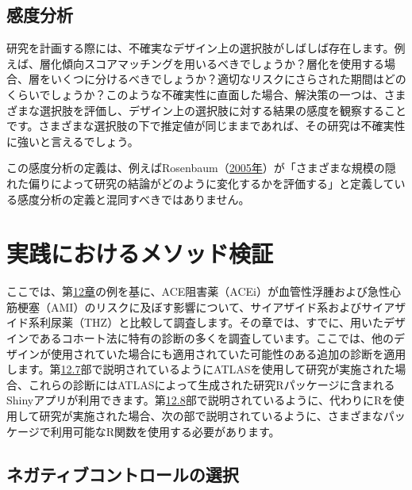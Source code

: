 \documentclass[
  11pt]{book}
\theoremstyle{definition}
\theoremstyle{definition}
\theoremstyle{definition}
\theoremstyle{definition}
\theoremstyle{remark}
\begin{document}
\subsection{感度分析}\label{ux611fux5ea6ux5206ux6790}


研究を計画する際には、不確実なデザイン上の選択肢がしばしば存在します。例えば、層化傾向スコアマッチングを用いるべきでしょうか？層化を使用する場合、層をいくつに分けるべきでしょうか？適切なリスクにさらされた期間はどのくらいでしょうか？このような不確実性に直面した場合、解決策の一つは、さまざまな選択肢を評価し、デザイン上の選択肢に対する結果の感度を観察することです。さまざまな選択肢の下で推定値が同じままであれば、その研究は不確実性に強いと言えるでしょう。

この感度分析の定義は、例えばRosenbaum（\href{https://ohdsi.github.io/TheBookOfOhdsi/MethodValidity.html\#ref-rosenbaum_2005}{2005年}）が「さまざまな規模の隠れた偏りによって研究の結論がどのように変化するかを評価する」と定義している感度分析の定義と混同すべきではありません。

\section{実践におけるメソッド検証}\label{ux5b9fux8df5ux306bux304aux3051ux308bux30e1ux30bdux30c3ux30c9ux691cux8a3c}

ここでは、第\href{https://ohdsi.github.io/TheBookOfOhdsi/PopulationLevelEstimation.html\#PopulationLevelEstimation}{12章}の例を基に、ACE阻害薬（ACEi）が血管性浮腫および急性心筋梗塞（AMI）のリスクに及ぼす影響について、サイアザイド系およびサイアザイド系利尿薬（THZ）と比較して調査します。その章では、すでに、用いたデザインであるコホート法に特有の診断の多くを調査しています。ここでは、他のデザインが使用されていた場合にも適用されていた可能性のある追加の診断を適用します。第\href{https://ohdsi.github.io/TheBookOfOhdsi/PopulationLevelEstimation.html\#PleAtlas}{12.7}部で説明されているようにATLASを使用して研究が実施された場合、これらの診断にはATLASによって生成された研究Rパッケージに含まれるShinyアプリが利用できます。第\href{https://ohdsi.github.io/TheBookOfOhdsi/PopulationLevelEstimation.html\#pleR}{12.8}部で説明されているように、代わりにRを使用して研究が実施された場合、次の部で説明されているように、さまざまなパッケージで利用可能なR関数を使用する必要があります。

\subsection{ネガティブコントロールの選択}\label{ux30cdux30acux30c6ux30a3ux30d6ux30b3ux30f3ux30c8ux30edux30fcux30ebux306eux9078ux629e}
\end{document}
